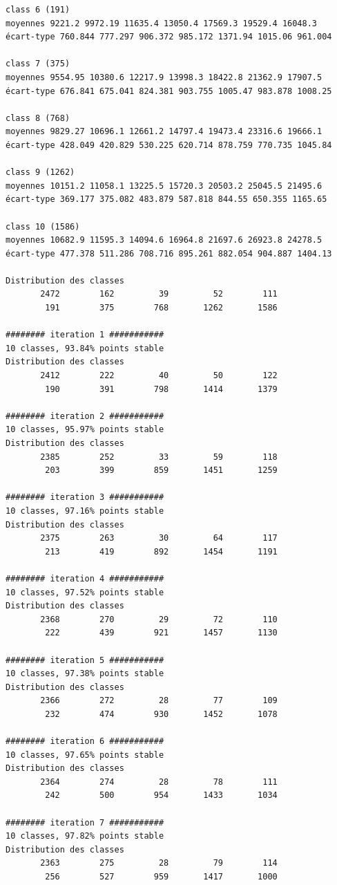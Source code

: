 \documentclass[earth,article,accept,pdftex,moreauthors]{Definitions/mdpi}
\begin{document}
{\begin{scriptsize}
\begin{verbatim}
class 6 (191)
moyennes 9221.2 9972.19 11635.4 13050.4 17569.3 19529.4 16048.3
écart-type 760.844 777.297 906.372 985.172 1371.94 1015.06 961.004

class 7 (375)
moyennes 9554.95 10380.6 12217.9 13998.3 18422.8 21362.9 17907.5
écart-type 676.841 675.041 824.381 903.755 1005.47 983.878 1008.25

class 8 (768)
moyennes 9829.27 10696.1 12661.2 14797.4 19473.4 23316.6 19666.1
écart-type 428.049 420.829 530.225 620.714 878.759 770.735 1045.84

class 9 (1262)
moyennes 10151.2 11058.1 13225.5 15720.3 20503.2 25045.5 21495.6
écart-type 369.177 375.082 483.879 587.818 844.55 650.355 1165.65

class 10 (1586)
moyennes 10682.9 11595.3 14094.6 16964.8 21697.6 26923.8 24278.5
écart-type 477.378 511.286 708.716 895.261 882.054 904.887 1404.13

Distribution des classes
       2472        162         39         52        111
        191        375        768       1262       1586

######## iteration 1 ###########
10 classes, 93.84% points stable
Distribution des classes
       2412        222         40         50        122
        190        391        798       1414       1379

######## iteration 2 ###########
10 classes, 95.97% points stable
Distribution des classes
       2385        252         33         59        118
        203        399        859       1451       1259

######## iteration 3 ###########
10 classes, 97.16% points stable
Distribution des classes
       2375        263         30         64        117
        213        419        892       1454       1191

######## iteration 4 ###########
10 classes, 97.52% points stable
Distribution des classes
       2368        270         29         72        110
        222        439        921       1457       1130

######## iteration 5 ###########
10 classes, 97.38% points stable
Distribution des classes
       2366        272         28         77        109
        232        474        930       1452       1078

######## iteration 6 ###########
10 classes, 97.65% points stable
Distribution des classes
       2364        274         28         78        111
        242        500        954       1433       1034

######## iteration 7 ###########
10 classes, 97.82% points stable
Distribution des classes
       2363        275         28         79        114
        256        527        959       1417       1000


\end{verbatim}
\end{scriptsize}}
\end{document}
